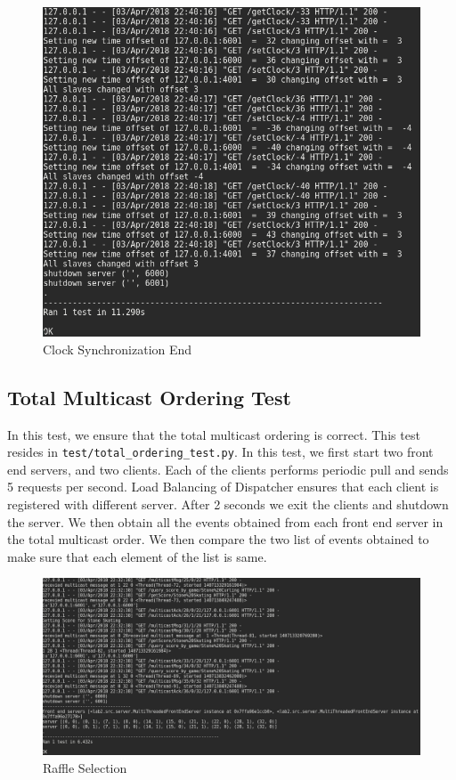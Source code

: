 \documentclass{article}
\begin{document}
\begin{figure}[H]
        \centering
        \includegraphics[width=\textwidth]{outputs/clock_sync_test_end.png}
        \caption{Clock Synchronization End \label{fig:clonk_synchronization}}
\end{figure}

\subsection{Total Multicast Ordering Test}
In this test, we ensure that the total multicast ordering is correct.
This test resides in \texttt{test/total\_ordering\_test.py}. In this test, we
first start two front end servers, and two clients. Each of the clients performs
periodic pull and sends 5 requests per second. Load Balancing of Dispatcher
ensures that each client is registered with different server. After 2 seconds
we exit the clients and shutdown the server. We then obtain all the events
obtained from each front end server in the total multicast order. We then
compare the two list of events obtained to make sure that each element of the 
list is same.

\begin{figure}[H]
        \centering
        \includegraphics[width=\textwidth]{outputs/total_order_test.png}
        \caption{Raffle Selection}
\end{figure}
\end{document}
